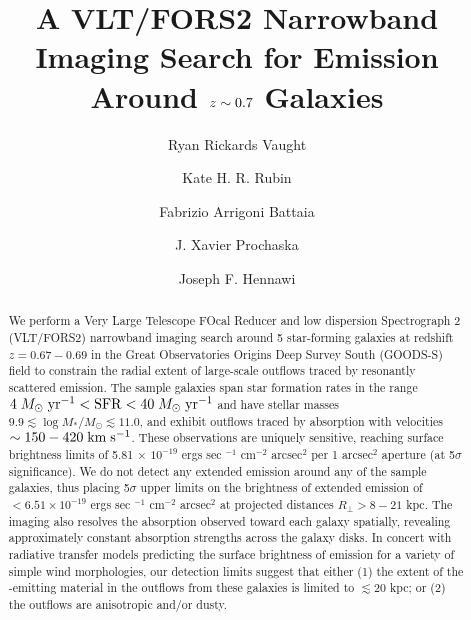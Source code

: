 \documentclass[trackchanges,twocolumn]{aastex62}
\def \mkms {{\rm \; km\;s^{-1}}}
\def \msunperyr {{\; M_{\odot}\rm \;yr^{-1}}}
\begin{document}
\title{A VLT/FORS2 Narrowband Imaging Search for  Emission Around $\lowercase{z}\sim0.7$ Galaxies }
\author{Ryan Rickards Vaught}
 
 
 \author{Kate H. R. Rubin}
 
 \author{Fabrizio Arrigoni Battaia }

 \author{J. Xavier Prochaska}
 
\author{Joseph F. Hennawi}


\begin{abstract}
We perform a Very Large Telescope FOcal Reducer and low dispersion Spectrograph 2 (VLT/FORS2) narrowband imaging search around 5 star-forming galaxies at redshift $z=0.67-0.69$ in the Great Observatories Origins Deep Survey South (GOODS-S) field to constrain the radial extent of large-scale outflows traced by resonantly scattered  emission. The sample galaxies span star formation rates in the range $4\msunperyr< \mathrm{SFR} < 40\msunperyr$ and have stellar masses $9.9 \lesssim \log M_{*}/M_{\odot} \lesssim 11.0$, and exhibit outflows traced by  absorption with velocities $\sim150-420\mkms$.
These observations are uniquely sensitive, reaching surface brightness limits of 5.81 $\times$ $10^{-19}$ ergs sec $^{-1}$ cm$^{-2}$ arcsec$^2$ per 1 arcsec$^2$ aperture (at 5$\sigma$ significance).  We do not detect any extended emission around any of the sample galaxies, thus placing 5$\sigma$ upper limits on the brightness of extended  emission of $<6.51 \times 10^{-19}$ ergs sec $^{-1}$ cm$^{-2}$ arcsec$^2$ at projected distances $R_{\perp} > 8-21$ kpc. The imaging also resolves the  absorption observed toward each galaxy spatially, revealing approximately constant absorption strengths across the galaxy disks. 
In concert with radiative transfer models predicting the surface brightness of  emission for a variety of simple wind morphologies, our detection limits suggest that either (1) the extent of the -emitting material in the outflows from these galaxies is limited to $\lesssim 20$ kpc; or (2) the outflows are anisotropic and/or dusty.  
\end{abstract}
\end{document}
